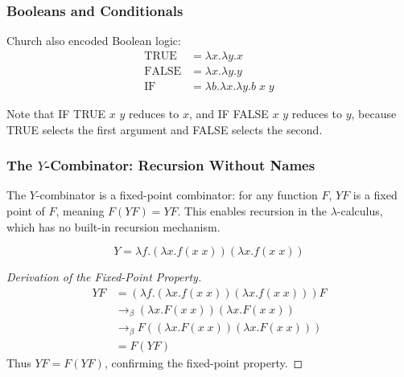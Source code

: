 \subsubsection*{Booleans and Conditionals}

Church also encoded Boolean logic:
\begin{align*}
\text{TRUE} &= \lambda x.\lambda y. x \\
\text{FALSE} &= \lambda x.\lambda y. y \\
\text{IF} &= \lambda b.\lambda x.\lambda y. b\; x\; y
\end{align*}

Note that IF TRUE $x$ $y$ reduces to $x$, and IF FALSE $x$ $y$ reduces to $y$, because TRUE selects the first argument and FALSE selects the second.

\subsubsection*{The $Y$-Combinator: Recursion Without Names}

The $Y$-combinator is a fixed-point combinator: for any function $F$, $Y F$ is a fixed point of $F$, meaning $F(Y F) = Y F$. This enables recursion in the $\lambda$-calculus, which has no built-in recursion mechanism.

\begin{definition}
\[
Y = \lambda f.(\lambda x. f(x\; x))(\lambda x. f(x\; x))
\]
\end{definition}

\begin{proof}[Derivation of the Fixed-Point Property]
\begin{align*}
Y F &= (\lambda f.(\lambda x. f(x\; x))(\lambda x. f(x\; x))) F \\
    &\to_\beta (\lambda x. F(x\; x))(\lambda x. F(x\; x)) \\
    &\to_\beta F((\lambda x. F(x\; x))(\lambda x. F(x\; x))) \\
    &= F(Y F)
\end{align*}
Thus $Y F = F(Y F)$, confirming the fixed-point property.
\end{proof}


